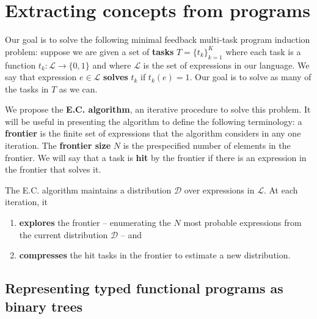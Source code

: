 \documentclass{article}
\begin{document}


\section{Extracting concepts from programs}

Our goal is to solve the following minimal feedback multi-task program
induction problem: suppose we are given a set of \textbf{tasks}
$T=\{t_k\}_{k=1}^K$ where each task is a function $t_k : \mathcal{L}
\rightarrow \{0, 1\}$ and where $\mathcal{L}$ is the set of
expressions in our language.  We say that expression $ e \in
\mathcal{L}$ \textbf{solves} $t_k$ if $ t_k(e) = 1$. Our goal is to
solve as many of the tasks in $T$ as we can.

We propose the \textbf{E.C. algorithm}, an iterative procedure to solve this
problem. It will be useful in presenting the algorithm to define the
following terminology: a \textbf{frontier} is the finite set of
expressions that the algorithm considers in any one iteration. The
\textbf{frontier size} $N$ is the prespecified number of elements in
the frontier. We will say that a task is \textbf{hit} by the frontier
if there is an expression in the frontier that solves it.

The E.C. algorithm maintains a distribution $\mathcal{D}$ over
expressions in $\mathcal{L}$. At each iteration, it
\begin{enumerate}
\item \textbf{explores} the frontier -- enumerating the $N$ most probable expressions
  from the current distribution $\mathcal{D}$ -- and
\item \textbf{compresses} the hit tasks in the frontier to estimate a new
  distribution.
\end{enumerate}

\subsection{Representing typed functional programs as binary trees}
\end{document}
